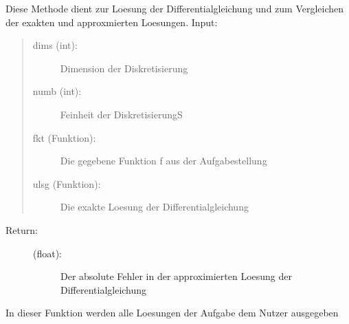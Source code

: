 \documentclass[letterpaper,10pt,ngerman]{sphinxmanual}
\begin{document}

\begin{fulllineitems}
\label{\detokenize{index:aufg_5_2.loesg}}
Diese Methode dient zur Loesung der Differentialgleichung und zum Vergleichen der exakten
und approxmierten Loesungen.
Input:
\begin{quote}
\begin{description}
\item[{dims (int):}] \leavevmode
Dimension der Diskretisierung

\item[{numb (int):}] \leavevmode
Feinheit der DiskretisierungS

\item[{fkt (Funktion):}] \leavevmode
Die gegebene Funktion f aus der Aufgabestellung

\item[{ulsg (Funktion):}] \leavevmode
Die exakte Loesung der Differentialgleichung

\end{description}
\end{quote}
\begin{description}
\item[{Return:}] \leavevmode\begin{description}
\item[{(float):}] \leavevmode
Der absolute Fehler in der approximierten Loesung der Differentialgleichung

\end{description}

\end{description}

\end{fulllineitems}


\begin{fulllineitems}
\label{\detokenize{index:aufg_5_2.main}}
In dieser Funktion werden alle Loesungen der Aufgabe dem Nutzer ausgegeben

\end{fulllineitems}

\end{document}
